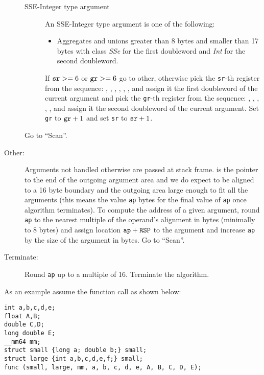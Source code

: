 \begin{description}
\begin{description}
    \item[SSE-Integer type argument]
      An SSE-Integer type argument is one of the following:
      \begin{itemize}
      \item Aggregates and unions greater than 8 bytes and smaller
        than 17 bytes with class \emph{SSe} for the first doubleword
        and \emph{Int} for the second doubleword.
      \end{itemize}
      If $\verb|sr| >= 6$ or $\verb|gr| >= 6$ go to other, otherwise
      pick the \verb|sr|-th register from the sequence: ,
      , , , , ,
       and assign it the first doubleword of the current
      argument and pick the \verb|gr|-th register from the sequence:
      \RAX, \RDX, \RCX, \RBX, \RSI, \RDI{} and assign it the second
      doubleword of the current argument.  Set \verb|gr| to
      $\verb|gr|+1$ and set \verb|sr| to $\verb|sr|+1$.

   \end{description}
   Go to ``Scan''.

  \item[Other:]

    Arguments not handled otherwise are passed at stack frame. \RSP{} is the
    pointer to the end of the outgoing argument area and we do expect \RSP{} to be
    aligned to a 16 byte boundary and the outgoing area large enough to fit all
    the arguments (this means the value \verb|ap| bytes for the final value of
    \verb|ap| once algorithm terminates).  To compute the address of a given argument,
    round \verb|ap| to the nearest multiple of the operand's alignment in bytes
    (minimally to 8 bytes) and
    assign location $\verb|ap|+\RSP$ to the argument and increase \verb|ap| by
    the size of the argument in bytes.
    Go to ``Scan''.

  \item[Terminate:]
    Round \verb|ap| up to a multiple of 16. Terminate the algorithm.
\end{description}

As an example assume the function call as shown below:

\begin{verbatim}
int a,b,c,d,e;
float A,B;
double C,D;
long double E;
__mm64 mm;
struct small {long a; double b;} small;
struct large {int a,b,c,d,e,f;} small;
func (small, large, mm, a, b, c, d, e, A, B, C, D, E);
\end{verbatim}

